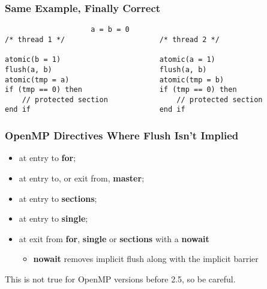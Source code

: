 \documentclass[aspectratio=43]{beamer}
\newenvironment{changemargin}[1]{%
  \begin{list}{}{%
    \setlength{\topsep}{0pt}%
    \setlength{\leftmargin}{#1}%
    \setlength{\rightmargin}{1em}
    \setlength{\listparindent}{\parindent}%
    \setlength{\itemindent}{\parindent}%
    \setlength{\parsep}{\parskip}%
  }%
  \item[]}{\end{list}}
\begin{document}
\begin{frame}[fragile]
  \frametitle{Same Example, Finally Correct}

  \begin{lstlisting}
                    a = b = 0
/* thread 1 */                      /* thread 2 */

atomic(b = 1)                       atomic(a = 1)
flush(a, b)                         flush(a, b)
atomic(tmp = a)                     atomic(tmp = b)
if (tmp == 0) then                  if (tmp == 0) then
    // protected section                // protected section
end if                              end if
  \end{lstlisting}
\end{frame}

\begin{frame}
  \frametitle{OpenMP Directives Where Flush Isn't Implied}

  \begin{changemargin}{1.5cm}
  \begin{itemize}
    \item at entry to {\bf for};
    \item at entry to, or exit from, {\bf master};
    \item at entry to {\bf sections}; 
    \item at entry to {\bf single};
    \item at exit from {\bf for}, {\bf single} or {\bf sections} with a {\bf nowait}
      \begin{itemize}
        \item {\bf nowait} removes implicit flush along with the implicit barrier
      \end{itemize}
  \end{itemize}

  This is not true for OpenMP versions before 2.5, so be careful.
  \end{changemargin}
\end{frame}
\end{document}
